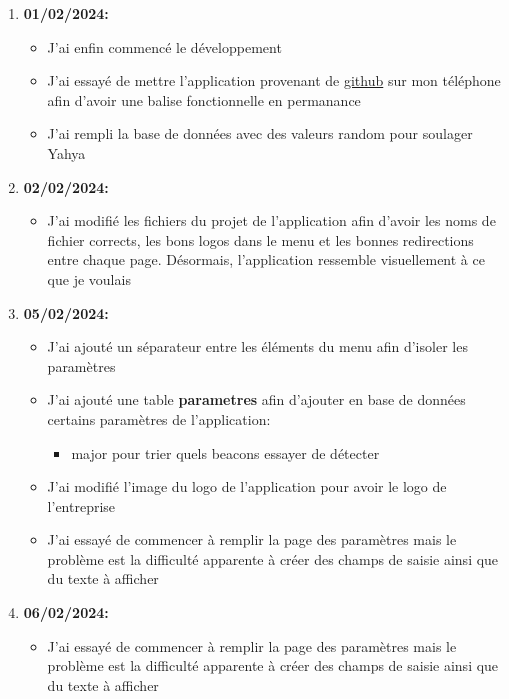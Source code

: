 \documentclass[10pt,a4paper]{book}
\begin{document}
\begin{enumerate}
    \item \textbf{01/02/2024:}
        \begin{itemize}
            \item J'ai enfin commencé le développement
            \item J'ai essayé de mettre l'application provenant de \href{https://github.com/Gabin221/android-beacon-library-reference-kotlin}{github} sur mon téléphone afin d'avoir une balise fonctionnelle en permanance
            \item J'ai rempli la base de données avec des valeurs random pour soulager Yahya
        \end{itemize}
    \item \textbf{02/02/2024:}
        \begin{itemize}
            \item J'ai modifié les fichiers du projet de l'application afin d'avoir les noms de fichier corrects, les bons logos dans le menu et les bonnes redirections entre chaque page. Désormais, l'application ressemble visuellement à ce que je voulais
        \end{itemize}
    \item \textbf{05/02/2024:}
        \begin{itemize}
            \item J'ai ajouté un séparateur entre les éléments du menu afin d'isoler les paramètres
            \item J'ai ajouté une table \textbf{parametres} afin d'ajouter en base de données certains paramètres de l'application: 
                \begin{itemize}
                    \item major pour trier quels beacons essayer de détecter
                \end{itemize}
            \item J'ai modifié l'image du logo de l'application pour avoir le logo de l'entreprise
            \item J'ai essayé de commencer à remplir la page des paramètres mais le problème est la difficulté apparente à créer des champs de saisie ainsi que du texte à afficher
        \end{itemize}
    \item \textbf{06/02/2024:}
        \begin{itemize}
            \item J'ai essayé de commencer à remplir la page des paramètres mais le problème est la difficulté apparente à créer des champs de saisie ainsi que du texte à afficher

\end{itemize}
\end{enumerate}
\end{document}
